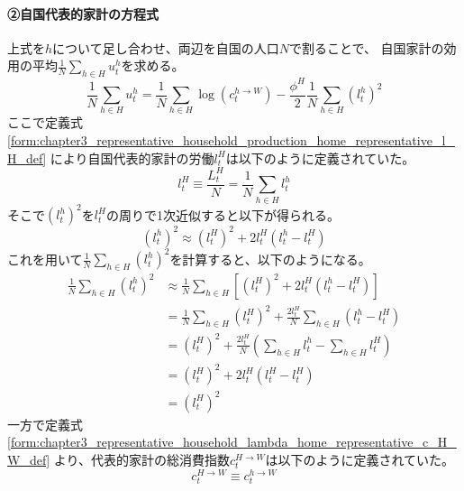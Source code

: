 \paragraph{②自国代表的家計の方程式}
\label{sec:chapter3_representative_household_utility_home_representative}
上式を\(h\)について足し合わせ、両辺を自国の人口\(N\)で割ることで、
自国家計の効用の平均\(\frac{1}{N}\sum_{h\in H}u_t^h\)を求める。
\begin{equation}
\label{form:chapter3_representative_household_utility_home_representative_average_u_h_eq}
    \frac{1}{N}\sum_{h\in H}u_t^h
    =\frac{1}{N}\sum_{h\in H}\log(c_t^{h\to W})-\frac{\phi^H}{2}\frac{1}{N}\sum_{h\in H}(l_t^h)^2
\end{equation}
ここで定義式
\eqref{form:chapter3_representative_household_production_home_representative_l_H_def}
により自国代表的家計の労働\(l_t^H\)は以下のように定義されていた。
\begin{equation}
\label{form:chapter3_representative_household_utility_home_representative_l_H_def}
    l_t^H\equiv\frac{L_t^H}{N}=\frac{1}{N}\sum_{h\in H}l_t^h
\end{equation}
そこで\((l_t^h)^2\)を\(l_t^H\)の周りで1次近似すると以下が得られる。
\begin{equation}
\label{form:chapter3_representative_household_utility_home_representative_l_H_sq_eq}
    (l_t^h)^2\approx(l_t^H)^2+2l_t^H(l_t^h-l_t^H)
\end{equation}
これを用いて\(\frac{1}{N}\sum_{h\in H}(l_t^h)^2\)を計算すると、以下のようになる。
\begin{equation}
\label{form:chapter3_representative_household_utility_home_representative_average_sum_l_H_sq_eq}
\begin{aligned}
    \frac{1}{N}\sum_{h\in H}(l_t^h)^2
    &\approx\frac{1}{N}\sum_{h\in H}\left[(l_t^H)^2+2l_t^H(l_t^h-l_t^H)\right] \\
    &=\frac{1}{N}\sum_{h\in H}(l_t^H)^2+\frac{2l_t^H}{N}\sum_{h\in H}(l_t^h-l_t^H) \\
    &=(l_t^H)^2+\frac{2l_t^H}{N}\left(\sum_{h\in H}l_t^h-\sum_{h\in H}l_t^H\right) \\
    &=(l_t^H)^2+2l_t^H(l_t^H-l_t^H) \\
    &=(l_t^H)^2
\end{aligned}
\end{equation}
一方で定義式
\eqref{form:chapter3_representative_household_lambda_home_representative_c_H_W_def}
より、代表的家計の総消費指数\(c_t^{H\to W}\)は以下のように定義されていた。
\begin{equation}
\label{form:chapter3_representative_household_utility_home_representative_c_H_W_def}
    c_t^{H\to W}\equiv c_t^{h\to W}
\end{equation}
